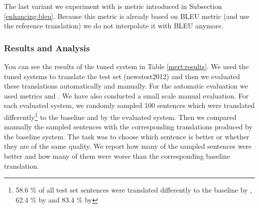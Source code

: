 The last variant we experiment with is  metric introduced
in Subsection \ref{enhancing:bleu}. Because this metric is already based on
BLEU metric (and use the reference translation) we do not interpolate it with
BLEU anymore.


\subsubsection{Results and Analysis}

You can see the results of the tuned system in Table \ref{mert:results}. We
used the tuned systems to translate the test set (newstest2012) and then we
evaluated these translations automatically and manually. For the automatic
evaluation we used metrics   and
 . We have also conducted a small
scale manual evaluation. For each evaluated system, we randomly sampled 100
sentences which were translated differently\footnote{58.6 \% of all test set
    sentences were translated differently to the baseline by
    , 62.4 \% by  and 83.4 \% by
} to the baseline and by the evaluated system. Then we
compared manually the sampled sentences with the corresponding translations
produced by the baseline system.  The task was to choose which sentence is
better or whether they are of the same quality. We report how many of the
sampled sentences were better and how many of them were worse than the
corresponding baseline translation.

